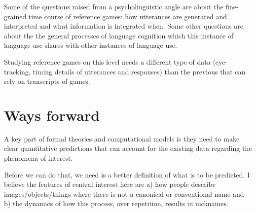 \documentclass[]{article}
\begin{document}
Some of the questions raised from a psycholinguistic angle are about the fine-grained time course of reference games: how utterances are generated and interpreted and what information is integrated when. Some other questions are about the the general processes of language cognition which this instance of language use shares with other instances of language use.

Studying reference games on this level needs a different type of data (eye-tracking, timing details of utterances and responses) than the previous that can rely on transcripts of games. 

\section{Ways forward}



	
	A key part of formal theories and computational models is they need to make clear quantitative predictions that can account for the existing data regarding the phenomena of interest. 
	
	
	Before we can do that, we need is a better definition of what is to be predicted. I believe the features of central interest here are a) how people describe images/objects/things where there is not a canonical or conventional name and b) the dynamics of how this process, over repetition, results in nicknames. %
	
\end{document}
